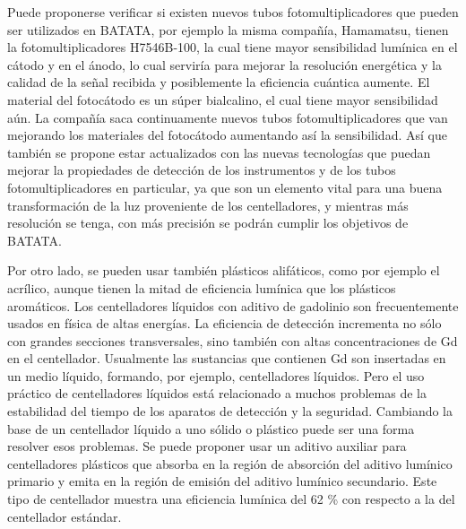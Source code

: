 \documentclass[a4paper,10pt]{article}
\numberwithin{equation}{section}
\begin{document}
\vspace{.3cm}

Puede proponerse verificar si existen nuevos tubos fotomultiplicadores que pueden ser 
utilizados en BATATA, por ejemplo la misma compañía, Hamamatsu, tienen la fotomultiplicadores
H7546B-100, la cual tiene mayor sensibilidad lumínica en el cátodo y en el ánodo, 
lo cual serviría para mejorar la resolución energética y la calidad de la señal 
recibida y posiblemente la eficiencia cuántica aumente. El material del fotocátodo 
es un súper bialcalino, el cual tiene mayor sensibilidad aún. La compañía saca 
continuamente nuevos tubos fotomultiplicadores que van mejorando los materiales 
del fotocátodo aumentando así la sensibilidad. Así que también se propone estar 
actualizados con las nuevas tecnologías que puedan mejorar la propiedades de 
detección de los instrumentos y de los tubos fotomultiplicadores en particular, 
ya que son un elemento vital para una buena transformación de la luz proveniente de 
los centelladores, y mientras más resolución se tenga, con más precisión se podrán 
cumplir los objetivos de BATATA.

\vspace{.3cm}

Por otro lado, se pueden usar también plásticos alifáticos, como por ejemplo el 
acrílico, aunque tienen la mitad de eficiencia lumínica que los plásticos aromáticos. 
Los centelladores líquidos con aditivo de gadolinio son frecuentemente usados en física de altas 
energías. La eficiencia de detección incrementa no sólo con grandes secciones transversales, sino 
también con altas concentraciones de Gd en el centellador. Usualmente las sustancias que 
contienen Gd son insertadas en un medio líquido, formando, por ejemplo, centelladores líquidos. 
Pero el uso práctico de centelladores líquidos está relacionado a muchos problemas de la 
estabilidad del tiempo de los aparatos de detección y la seguridad. Cambiando la base de un 
centellador líquido a uno sólido o plástico puede ser una forma resolver esos problemas. Se puede 
proponer usar un aditivo auxiliar para centelladores plásticos que absorba en la región de 
absorción del aditivo lumínico primario y emita en la región de emisión del aditivo lumínico 
secundario. Este tipo de centellador muestra una eficiencia lumínica del 62 \% con respecto a la del 
centellador estándar.

\vspace{.3cm}
\end{document}
